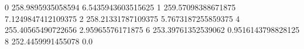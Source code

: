 0 258.9895935058594 6.5435943603515625
1 259.57098388671875 7.1249847412109375
2 258.21331787109375 5.7673187255859375
4 255.40565490722656 2.95965576171875
6 253.39761352539062 0.9516143798828125
8 252.4459991455078 0.0
